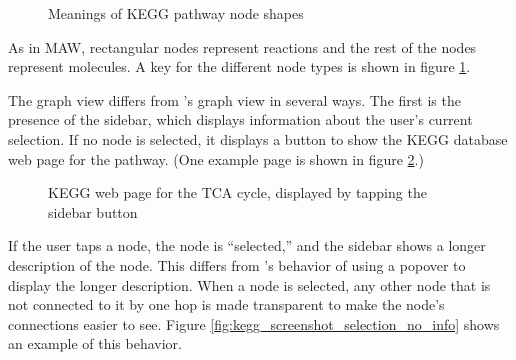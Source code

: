 \begin{figure}[hbt]
    \caption{\label{fig:kegg_node_legend} Meanings of KEGG pathway node shapes}
\end{figure}

As in MAW, rectangular nodes represent reactions and the rest of the nodes
represent molecules. A key for the different node types is shown in figure
\ref{fig:kegg_node_legend}.

The graph view differs from \mawapp's graph view in several ways. The first
is the presence of the sidebar, which displays information about the user's
current selection. If no node is selected, it displays a button to show the KEGG
database web page for the pathway. (One example page is shown in figure
\ref{fig:kegg_screenshot_kegg_web_site}.)

\begin{figure}[hbt]
    \caption{\label{fig:kegg_screenshot_kegg_web_site} KEGG web page for the TCA
    cycle, displayed by tapping the sidebar button}
\end{figure}

If the user taps a node, the node is ``selected,'' and the sidebar shows a
longer description of the node.  This differs from \mawapp's behavior of using
a popover to display the longer description. When a node is selected, any other
node that is not connected to it by one hop is made transparent to make the
node's connections easier to see.  Figure
\ref{fig:kegg_screenshot_selection_no_info} shows an example of this behavior.

